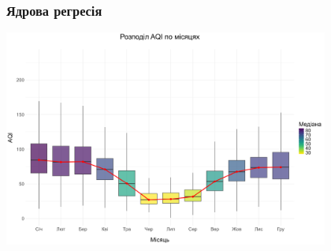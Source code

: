 ﻿\documentclass{beamer}
\begin{document}
\begin{frame}
  \frametitle{Ядрова регресія}

  \begin{center}
    \includegraphics[height=2.8in]{plots/lab4/kernal/seasonal_change_median_line.png}
  \end{center}

\end{frame}
\end{document}
